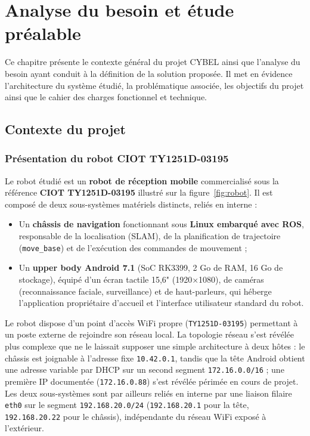 \newpage
\section{Analyse du besoin et étude préalable}

Ce chapitre présente le contexte général du projet CYBEL ainsi que l'analyse
du besoin ayant conduit à la définition de la solution proposée. Il met en
évidence l'architecture du système étudié, la problématique associée, les
objectifs du projet ainsi que le cahier des charges fonctionnel et technique.

\subsection{Contexte du projet}

\subsubsection*{Présentation du robot CIOT TY1251D-03195}

Le robot étudié est un \textbf{robot de réception mobile} commercialisé sous la
référence \textbf{CIOT TY1251D-03195} illustré sur la figure~\ref{fig:robot}. Il est composé de deux sous-systèmes
matériels distincts, reliés en interne :

\begin{itemize}
    \item Un \textbf{châssis de navigation} fonctionnant sous \textbf{Linux
    embarqué avec ROS}, responsable de la localisation (SLAM), de la planification
    de trajectoire (\texttt{move\_base}) et de l'exécution des commandes de
    mouvement ;
    \item Un \textbf{\og upper body \fg{} Android 7.1} (SoC RK3399, 2 Go de RAM,
    16 Go de stockage), équipé d'un écran tactile 15,6" (1920×1080), de caméras
    (reconnaissance faciale, surveillance) et de haut-parleurs, qui héberge
    l'application propriétaire d'accueil et l'interface utilisateur standard du
    robot.
\end{itemize}

Le robot dispose d'un point d'accès WiFi propre (\texttt{TY1251D-03195})
permettant à un poste externe de rejoindre son réseau local. La topologie
réseau s'est révélée plus complexe que ne le laissait supposer une simple
architecture à deux hôtes : le châssis est joignable à l'adresse fixe
\texttt{10.42.0.1}, tandis que la tête Android obtient une adresse variable
par DHCP sur un second segment \texttt{172.16.0.0/16} ; une première IP
documentée (\texttt{172.16.0.88}) s'est révélée périmée en cours de projet.
Les deux sous-systèmes sont par ailleurs reliés en interne par une liaison
filaire \texttt{eth0} sur le segment \texttt{192.168.20.0/24}
(\texttt{192.168.20.1} pour la tête, \texttt{192.168.20.22} pour le châssis),
indépendante du réseau WiFi exposé à l'extérieur.

